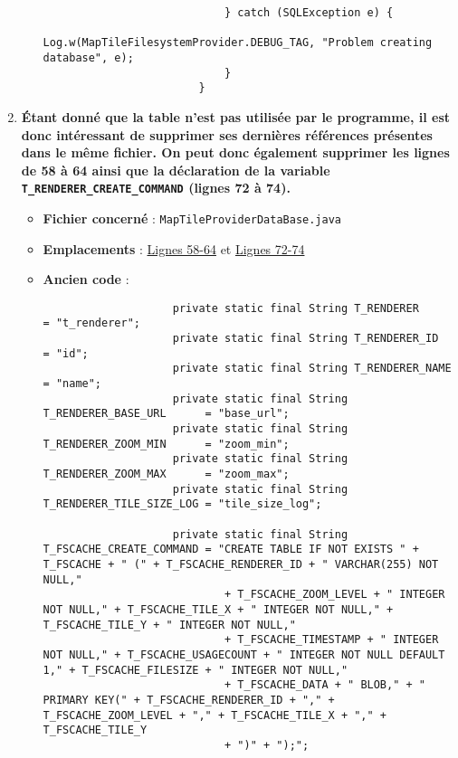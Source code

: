 \begin{enumerate}
\begin{itemize}
\begin{verbatim}
                            } catch (SQLException e) {
                                Log.w(MapTileFilesystemProvider.DEBUG_TAG, "Problem creating database", e);
                            }
                        }
                    \end{verbatim}
          \end{itemize}
    \item \textbf{Étant donné que la table n'est pas utilisée par le programme, il est donc intéressant de supprimer ses dernières références présentes dans le même fichier. On peut donc également supprimer les lignes de 58 à 64 ainsi que la déclaration de la variable \texttt{T_RENDERER_CREATE_COMMAND} (lignes 72 à 74).}
          \begin{itemize}
              \item \textbf{Fichier concerné} : \texttt{MapTileProviderDataBase.java}
              \item \textbf{Emplacements} :
                    \href{https://github.com/MarcusWolschon/osmeditor4android/blob/127fb689ad42c77558e4512e14de754e0561cd27/src/main/java/de/blau/android/services/util/MapTileProviderDataBase.java#L58-L64}{Lignes 58-64} et \href{https://github.com/MarcusWolschon/osmeditor4android/blob/127fb689ad42c77558e4512e14de754e0561cd27/src/main/java/de/blau/android/services/util/MapTileProviderDataBase.java#L72-L74}{Lignes 72-74}
              \item \textbf{Ancien code} :
                    \begin{verbatim}
                    private static final String T_RENDERER               = "t_renderer";
                    private static final String T_RENDERER_ID            = "id";
                    private static final String T_RENDERER_NAME          = "name";
                    private static final String T_RENDERER_BASE_URL      = "base_url";
                    private static final String T_RENDERER_ZOOM_MIN      = "zoom_min";
                    private static final String T_RENDERER_ZOOM_MAX      = "zoom_max";
                    private static final String T_RENDERER_TILE_SIZE_LOG = "tile_size_log";

                    private static final String T_FSCACHE_CREATE_COMMAND = "CREATE TABLE IF NOT EXISTS " + T_FSCACHE + " (" + T_FSCACHE_RENDERER_ID + " VARCHAR(255) NOT NULL,"
                            + T_FSCACHE_ZOOM_LEVEL + " INTEGER NOT NULL," + T_FSCACHE_TILE_X + " INTEGER NOT NULL," + T_FSCACHE_TILE_Y + " INTEGER NOT NULL,"
                            + T_FSCACHE_TIMESTAMP + " INTEGER NOT NULL," + T_FSCACHE_USAGECOUNT + " INTEGER NOT NULL DEFAULT 1," + T_FSCACHE_FILESIZE + " INTEGER NOT NULL,"
                            + T_FSCACHE_DATA + " BLOB," + " PRIMARY KEY(" + T_FSCACHE_RENDERER_ID + "," + T_FSCACHE_ZOOM_LEVEL + "," + T_FSCACHE_TILE_X + "," + T_FSCACHE_TILE_Y
                            + ")" + ");";


\end{verbatim}
\end{itemize}
\end{enumerate}
